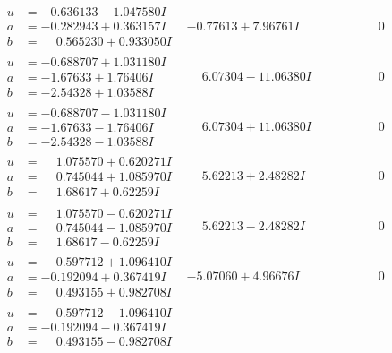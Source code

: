 \documentclass[1p]{elsarticle_modified}
\theoremstyle{definition}
\begin{document}
$$\begin{array}{c|c|c}
\begin{aligned}
u &= -0.636133 - 1.047580 I \\
a &= -0.282943 + 0.363157 I \\
b &= \phantom{-}0.565230 + 0.933050 I\end{aligned}
 & -0.77613 + 7.96761 I & \phantom{-0.000000 } 0 \\ \hline\begin{aligned}
u &= -0.688707 + 1.031180 I \\
a &= -1.67633 + 1.76406 I \\
b &= -2.54328 + 1.03588 I\end{aligned}
 & \phantom{-}6.07304 - 11.06380 I & \phantom{-0.000000 } 0 \\ \hline\begin{aligned}
u &= -0.688707 - 1.031180 I \\
a &= -1.67633 - 1.76406 I \\
b &= -2.54328 - 1.03588 I\end{aligned}
 & \phantom{-}6.07304 + 11.06380 I & \phantom{-0.000000 } 0 \\ \hline\begin{aligned}
u &= \phantom{-}1.075570 + 0.620271 I \\
a &= \phantom{-}0.745044 + 1.085970 I \\
b &= \phantom{-}1.68617 + 0.62259 I\end{aligned}
 & \phantom{-}5.62213 + 2.48282 I & \phantom{-0.000000 } 0 \\ \hline\begin{aligned}
u &= \phantom{-}1.075570 - 0.620271 I \\
a &= \phantom{-}0.745044 - 1.085970 I \\
b &= \phantom{-}1.68617 - 0.62259 I\end{aligned}
 & \phantom{-}5.62213 - 2.48282 I & \phantom{-0.000000 } 0 \\ \hline\begin{aligned}
u &= \phantom{-}0.597712 + 1.096410 I \\
a &= -0.192094 + 0.367419 I \\
b &= \phantom{-}0.493155 + 0.982708 I\end{aligned}
 & -5.07060 + 4.96676 I & \phantom{-0.000000 } 0 \\ \hline\begin{aligned}
u &= \phantom{-}0.597712 - 1.096410 I \\
a &= -0.192094 - 0.367419 I \\
b &= \phantom{-}0.493155 - 0.982708 I\end{aligned}

\end{array}$$
\end{document}

